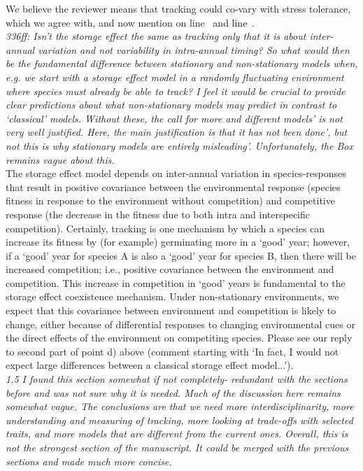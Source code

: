 \documentclass[11pt]{article}
\newcommand{\lr}[1]{line~\lineref{#1}}
\begin{document}
We believe the reviewer means that tracking could co-vary with stress tolerance, which we agree with, and now mention on \lr{r1stress} and \lr{stressagain}.\\

\emph{336ff: Isn't the storage effect the same as tracking only that it is about inter-annual
variation and not variability in intra-annual timing? So what would then be the fundamental
difference between stationary and non-stationary models when, e.g. we start with a storage
effect model in a randomly fluctuating environment where species must already be able to
track? I feel it would be crucial to provide clear predictions about what non-stationary
models may predict in contrast to  `classical' models. Without these, the call for more and
different models' is not very well justified. Here, the main justification is that it has
not been done', but not this is why stationary models are entirely misleading'.
Unfortunately, the Box remains vague about this.}\\

The storage effect model depends on inter-annual variation in species-responses that result in positive covariance between the environmental response (species fitness in response to the environment without competition) and competitive response (the decrease in the fitness due to both intra and interspecific competition).  Certainly, tracking is one mechanism by which a species can increase its fitness by (for example) germinating more in a `good' year; however, if a `good' year for species A is also a `good' year for species B, then there will be increased competition; i.e., positive covariance between the environment and competition.  This increase in competition in `good' years is fundamental to the storage effect coexistence mechanism.  Under non-stationary environments, we expect that this covariance between environment and competition is likely to change, either because of differential responses to changing environmental cues or the direct effects of the environment on competiting species.   Please see our reply to second part of point d) above (comment starting with `In fact, I would not expect large differences between a classical storage effect model...').\\

\emph{1.5 I found this section somewhat if not completely- redundant with the sections before and
was not sure why it is needed. Much of the discussion here remains somewhat vague. The
conclusions are that we need more interdisciplinarity, more understanding and measuring of
tracking, more looking at trade-offs with selected traits, and more models that are different
from the current ones. Overall, this is not the strongest section of the manuscript. It could
be merged with the previous sections and made much more concise.}\\
\end{document}
